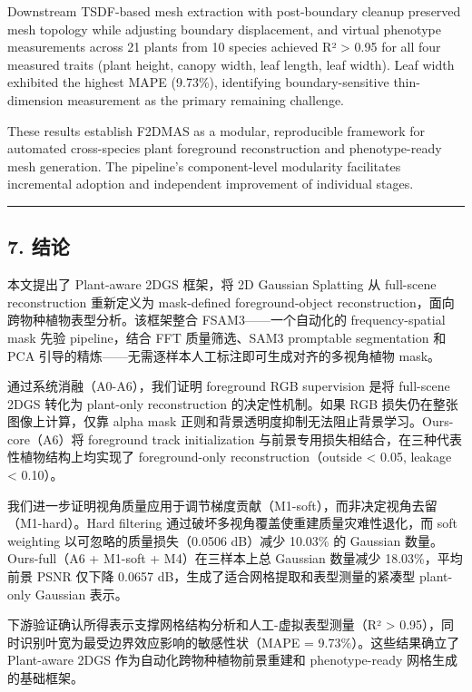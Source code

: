 \documentclass[11pt,a4paper]{article}
\begin{document}
Downstream TSDF-based mesh extraction with post-boundary cleanup
preserved mesh topology while adjusting boundary displacement, and
virtual phenotype measurements across 21 plants from 10 species achieved
R² \textgreater{} 0.95 for all four measured traits (plant height,
canopy width, leaf length, leaf width). Leaf width exhibited the highest
MAPE (9.73\%), identifying boundary-sensitive thin-dimension measurement
as the primary remaining challenge.

These results establish F2DMAS as a modular, reproducible framework for
automated cross-species plant foreground reconstruction and
phenotype-ready mesh generation. The pipeline's component-level
modularity facilitates incremental adoption and independent improvement
of individual stages.

\begin{center}\rule{0.5\linewidth}{0.5pt}\end{center}

\subsection{7. 结论}\label{ux7ed3ux8bba}

本文提出了 Plant-aware 2DGS 框架，将 2D Gaussian Splatting 从 full-scene
reconstruction 重新定义为 mask-defined foreground-object
reconstruction，面向跨物种植物表型分析。该框架整合
FSAM3------一个自动化的 frequency-spatial mask 先验 pipeline，结合 FFT
质量筛选、SAM3 promptable segmentation 和 PCA
引导的精炼------无需逐样本人工标注即可生成对齐的多视角植物 mask。

通过系统消融（A0-A6），我们证明 foreground RGB supervision 是将
full-scene 2DGS 转化为 plant-only reconstruction 的决定性机制。如果 RGB
损失仍在整张图像上计算，仅靠 alpha mask
正则和背景透明度抑制无法阻止背景学习。Ours-core（A6）将 foreground track
initialization 与前景专用损失相结合，在三种代表性植物结构上均实现了
foreground-only reconstruction（outside \textless{} 0.05, leakage
\textless{} 0.10）。

我们进一步证明视角质量应用于调节梯度贡献（M1-soft），而非决定视角去留（M1-hard）。Hard
filtering 通过破坏多视角覆盖使重建质量灾难性退化，而 soft weighting
以可忽略的质量损失（0.0506 dB）减少 10.03\% 的 Gaussian
数量。Ours-full（A6 + M1-soft + M4）在三样本上总 Gaussian 数量减少
18.03\%，平均前景 PSNR 仅下降 0.0657
dB，生成了适合网格提取和表型测量的紧凑型 plant-only Gaussian 表示。

下游验证确认所得表示支撑网格结构分析和人工-虚拟表型测量（R²
\textgreater{} 0.95），同时识别叶宽为最受边界效应影响的敏感性状（MAPE =
9.73\%）。这些结果确立了 Plant-aware 2DGS 作为自动化跨物种植物前景重建和
phenotype-ready 网格生成的基础框架。
\end{document}
